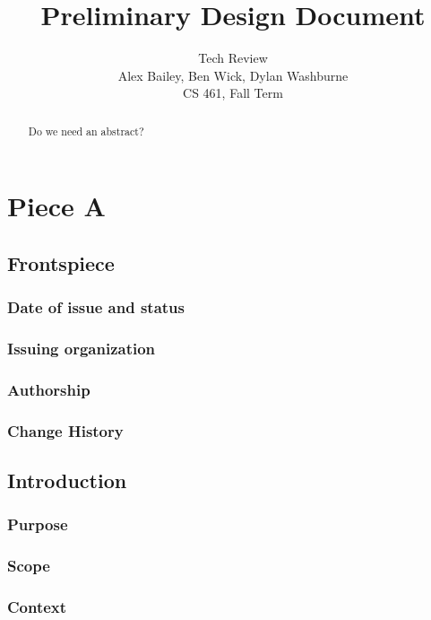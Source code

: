 \documentclass[letterpaper,10pt,onecolumn,draftclsnofoot]{IEEEtran}
\title{Preliminary Design Document}
\author{Tech Review\\Alex Bailey, Ben Wick, Dylan Washburne\\CS 461, Fall Term}
\begin{document}
\begin{titlepage}

\maketitle

\begin{abstract}
Do we need an abstract?
 
\end{abstract}

\end{titlepage}

\tableofcontents
\newpage

\section{Piece A}

\subsection{Frontspiece}
\subsubsection{Date of issue and status}
\subsubsection{Issuing organization}
\subsubsection{Authorship}
\subsubsection{Change History}

\subsection{Introduction}
\subsubsection{Purpose}
\subsubsection{Scope}
\subsubsection{Context}
\end{document}
